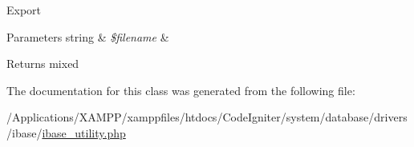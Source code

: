 Export


\begin{DoxyParams}[1]{Parameters}
string & {\em \$filename} & \\
\hline
\end{DoxyParams}
\begin{DoxyReturn}{Returns}
mixed 
\end{DoxyReturn}


The documentation for this class was generated from the following file\+:\begin{DoxyCompactItemize}
\item 
/\+Applications/\+X\+A\+M\+P\+P/xamppfiles/htdocs/\+Code\+Igniter/system/database/drivers/ibase/\mbox{\hyperlink{ibase__utility_8php}{ibase\+\_\+utility.\+php}}\end{DoxyCompactItemize}

